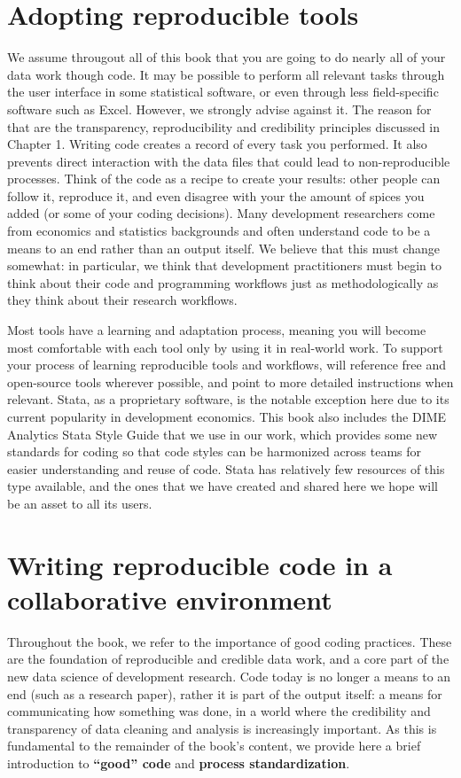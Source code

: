 \section{Adopting reproducible tools}

We assume througout all of this book
that you are going to do nearly all of your data work though code.
It may be possible to perform all relevant tasks
through the user interface in some statistical software,
or even through less field-specific software such as Excel.
However, we strongly advise against it.
The reason for that are the transparency, reproducibility and credibility principles
discussed in Chapter 1.
Writing code creates a record of every task you performed.
It also prevents direct interaction
with the data files that could lead to non-reproducible processes.
Think of the code as a recipe to create your results:
other people can follow it, reproduce it,
and even disagree with your the amount of spices you added
(or some of your coding decisions).
Many development researchers come from economics and statistics backgrounds
and often understand code to be a means to an end rather than an output itself.
We believe that this must change somewhat:
in particular, we think that development practitioners
must begin to think about their code and programming workflows
just as methodologically as they think about their research workflows.

Most tools have a learning and adaptation process,
meaning you will become most comfortable with each tool
only by using it in real-world work.
To support your process of learning reproducible tools and workflows,
will reference free and open-source tools wherever possible,
and point to more detailed instructions when relevant.
Stata, as a proprietary software, is the notable exception here
due to its current popularity in development economics.
This book also includes
the DIME Analytics Stata Style Guide
that we use in our work, which provides
some new standards for coding so that code styles
can be harmonized across teams for easier understanding and reuse of code.
Stata has relatively few resources of this type available,
and the ones that we have created and shared here
we hope will be an asset to all its users.


\section{Writing reproducible code in a collaborative environment}
Throughout the book, we refer to the importance of good coding practices.
These are the foundation of reproducible and credible data work,
and a core part of the new data science of development research.
Code today is no longer a means to an end (such as a research paper),
rather it is part of the output itself: a means for communicating how something was done,
in a world where the credibility and transparency of data cleaning and analysis is increasingly important.
As this is fundamental to the remainder of the book's content,
we provide here a brief introduction to \textbf{``good'' code} and \textbf{process standardization}.


